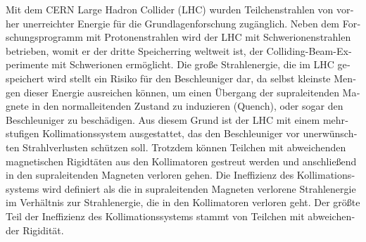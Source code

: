 \begin{otherlanguage}{german}

Mit dem CERN Large Hadron Collider (LHC) wurden Teilchenstrahlen von vorher \mbox{unerreichter} \mbox{Energie} f\"{u}r die Grundlagenforschung zug\"{a}nglich. Neben dem Forschungsprogramm mit Protonenstrahlen wird der LHC mit Schwerionenstrahlen betrieben, womit er der dritte Speicherring weltweit ist, der Colliding-Beam-Experimente mit Schwerionen erm\"{o}glicht. Die gro\ss e Strahlenergie, die im LHC gespeichert wird stellt ein Risiko f\"{u}r den Beschleuniger dar, da selbst kleinste Mengen dieser Energie ausreichen k\"{o}nnen, um einen \"{U}bergang der supraleitenden Magnete in den normalleitenden Zustand zu induzieren (Quench), oder sogar den Beschleuniger zu besch\"{a}digen. Aus diesem Grund ist der LHC mit einem mehrstufigen \mbox{Kollimationssystem} \mbox{ausgestattet}, das den Beschleuniger vor  unerw\"{u}nschten Strahlverlusten sch\"{u}tzen soll. Trotzdem k\"{o}nnen Teilchen mit abweichenden magnetischen Rigidt\"{a}ten aus den Kollimatoren gestreut werden und anschlie\ss end in den supraleitenden Magneten verloren gehen. Die Ineffizienz des Kollimationssystems wird definiert als die in supraleitenden Magneten verlorene Strahlenergie im Verh\"{a}ltnis zur Strahlenergie, die in den Kollimatoren verloren geht. Der gr\"{o}\ss te Teil der Ineffizienz des Kollimationssystems stammt von Teilchen mit abweichender Rigidit\"{a}t. 






\end{otherlanguage}
